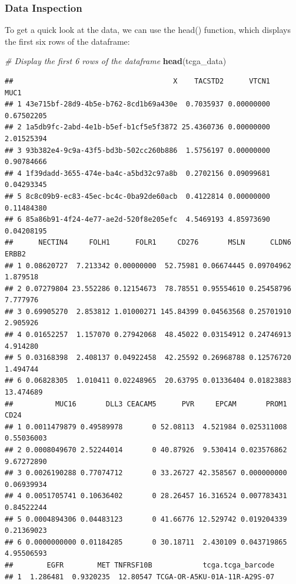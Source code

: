 \documentclass[
]{book}
\newenvironment{Shaded}{\begin{snugshade}}{\end{snugshade}}
\newcommand{\CommentTok}[1]{\textcolor[rgb]{0.56,0.35,0.01}{\textit{#1}}}
\newcommand{\FunctionTok}[1]{\textcolor[rgb]{0.13,0.29,0.53}{\textbf{#1}}}
\newcommand{\NormalTok}[1]{#1}
\begin{document}
\hypertarget{data-inspection}{%
\subsubsection{Data Inspection}\label{data-inspection}}

To get a quick look at the data, we can use the head() function, which displays the first six rows of the dataframe:

\begin{Shaded}
\begin{Highlighting}[]
\CommentTok{\# Display the first 6 rows of the dataframe}
\FunctionTok{head}\NormalTok{(tcga\_data)}
\end{Highlighting}
\end{Shaded}

\begin{verbatim}
##                                      X    TACSTD2      VTCN1       MUC1
## 1 43e715bf-28d9-4b5e-b762-8cd1b69a430e  0.7035937 0.00000000 0.67502205
## 2 1a5db9fc-2abd-4e1b-b5ef-b1cf5e5f3872 25.4360736 0.00000000 2.01525394
## 3 93b382e4-9c9a-43f5-bd3b-502cc260b886  1.5756197 0.00000000 0.90784666
## 4 1f39dadd-3655-474e-ba4c-a5bd32c97a8b  0.2702156 0.09099681 0.04293345
## 5 8c8c09b9-ec83-45ec-bc4c-0ba92de60acb  0.4122814 0.00000000 0.11484380
## 6 85a86b91-4f24-4e77-ae2d-520f8e205efc  4.5469193 4.85973690 0.04208195
##      NECTIN4     FOLH1      FOLR1     CD276       MSLN      CLDN6     ERBB2
## 1 0.08620727  7.213342 0.00000000  52.75981 0.06674445 0.09704962  1.879518
## 2 0.07279804 23.552286 0.12154673  78.78551 0.95554610 0.25458796  7.777976
## 3 0.69905270  2.853812 1.01000271 145.84399 0.04563568 0.25701910  2.905926
## 4 0.01652257  1.157070 0.27942068  48.45022 0.03154912 0.24746913  4.914280
## 5 0.03168398  2.408137 0.04922458  42.25592 0.26968788 0.12576720  1.494744
## 6 0.06828305  1.010411 0.02248965  20.63795 0.01336404 0.01823883 13.474689
##          MUC16       DLL3 CEACAM5      PVR     EPCAM       PROM1       CD24
## 1 0.0011479879 0.49589978       0 52.08113  4.521984 0.025311008 0.55036003
## 2 0.0008049670 2.52244014       0 40.87926  9.530414 0.023576862 9.67272890
## 3 0.0026190288 0.77074712       0 33.26727 42.358567 0.000000000 0.06939934
## 4 0.0051705741 0.10636402       0 28.26457 16.316524 0.007783431 0.84522244
## 5 0.0004894306 0.04483123       0 41.66776 12.529742 0.019204339 0.21369023
## 6 0.0000000000 0.01184285       0 30.18711  2.430109 0.043719865 4.95506593
##        EGFR        MET TNFRSF10B            tcga.tcga_barcode
## 1  1.286481  0.9320235  12.80547 TCGA-OR-A5KU-01A-11R-A29S-07

\end{verbatim}
\end{document}
